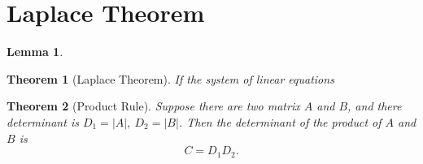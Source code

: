 \documentclass{article}
\newtheorem{theorem}{Theorem}[section]
\newtheorem{lemma}{Lemma}[section]
\theoremstyle{definition}
\begin{document}
\section{Laplace Theorem}
\begin{lemma}
\end{lemma}

\begin{theorem}[Laplace Theorem]
    If the system of linear equations
\end{theorem}


\begin{theorem}[Product Rule]
    Suppose there are two matrix $A$ and $B$,
    and there determinant is $D_{1}=|A|,\ D_{2}=|B|$.
    Then the determinant of the product of $A$ and $B$ is
    $$C=D_{1}D_{2}.$$
\end{theorem}

\newpage
\end{document}
